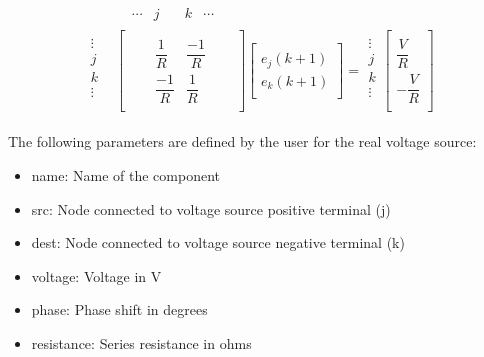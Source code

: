 \begin{align} \label{eq:MatrixStampRealVS}
\begin{split}
&
\begin{matrix}
& \cdots & j & \quad k & \cdots
\end{matrix}\\[-6pt]
\begin{matrix}
\vdots\\[6pt]
j\\[6pt]
k\\[6pt]
\vdots\\
\end{matrix}
&
\begin{bmatrix}
	\quad & \quad &  \\[6pt]
	\quad & \dfrac{1}{R} & \dfrac{-1}{R} & \quad  \\[6pt]
	\quad & \dfrac{-1}{R} & \dfrac{1}{R} & \quad \\[6pt]
	\quad &  & 
\end{bmatrix}
\begin{bmatrix}
	\quad \\[6pt]
	e_j(k+1)\\[6pt]
	e_k(k+1)\\[6pt]
	\quad
\end{bmatrix}
=
\begin{matrix}
\vdots\\[6pt]
j\\[6pt]
k\\[6pt]
\vdots\\
\end{matrix}
\begin{bmatrix}
	\quad \\[6pt]
	\dfrac{V}{R} \\[6pt]
	-\dfrac{V}{R} \\[6pt]
	\quad
\end{bmatrix}
\end{split}
\end{align}

The following parameters are defined by the user for the real voltage source:

\begin{itemize}
\item name: Name of the component
\item src: Node connected to voltage source positive terminal (j)
\item dest: Node connected to voltage source negative terminal (k)
\item voltage: Voltage in V
\item phase: Phase shift in degrees
\item resistance: Series resistance in ohms 
\end{itemize}

